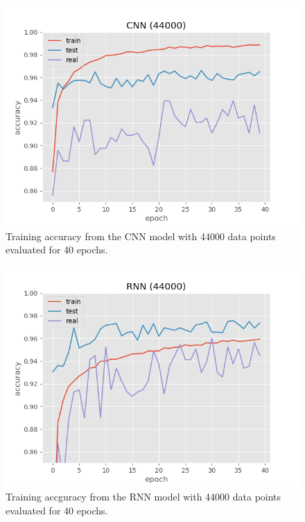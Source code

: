\begin{figure}[H]
    \centering
    \includegraphics[width=0.8\linewidth]{Assets/Chapter4_Result/CNN_40_epoch.png}
    \caption{Training accuracy from the CNN model with 44000 data points evaluated for 40 epochs.}
    \label{fig:CNN_44000}
\end{figure}
\begin{figure}[H]
    \centering
    \includegraphics[width=0.8\linewidth]{Assets/Chapter4_Result/RNN_40_epoch.png}
    \caption{Training accguracy from the RNN model with 44000 data points evaluated for 40 epochs.}
    \label{fig:RNN_44000}
\end{figure}


